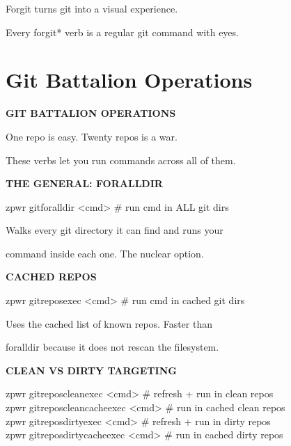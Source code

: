 \documentclass[11pt,a4paper,twoside]{book}
\begin{document}
Forgit turns git into a visual experience.

\begin{codebox}
Every forgit* verb is a regular git command with eyes.\\
\end{codebox}


\vspace{16pt}

\section{Git Battalion Operations}


\vspace{10pt}
{\large\bfseries\color{neoncyan} GIT BATTALION OPERATIONS}\vspace{6pt}

One repo is easy. Twenty repos is a war.

These verbs let you run commands across all of them.


\vspace{12pt}
{\bfseries\color{neonyellow} THE GENERAL: FORALLDIR}\vspace{4pt}

\begin{codebox}
zpwr gitforalldir <cmd>   \# run cmd in ALL git dirs\\
\end{codebox}

Walks every git directory it can find and runs your

command inside each one. The nuclear option.


\vspace{12pt}
{\bfseries\color{neonyellow} CACHED REPOS}\vspace{4pt}

\begin{codebox}
zpwr gitreposexec <cmd>    \# run cmd in cached git dirs\\
\end{codebox}

Uses the cached list of known repos. Faster than

foralldir because it does not rescan the filesystem.


\vspace{12pt}
{\bfseries\color{neonyellow} CLEAN VS DIRTY TARGETING}\vspace{4pt}

\begin{codebox}
zpwr gitreposcleanexec <cmd>       \# refresh + run in clean repos\\
zpwr gitreposcleancacheexec <cmd>  \# run in cached clean repos\\
zpwr gitreposdirtyexec <cmd>       \# refresh + run in dirty repos\\
zpwr gitreposdirtycacheexec <cmd>  \# run in cached dirty repos\\
\end{codebox}
\end{document}
